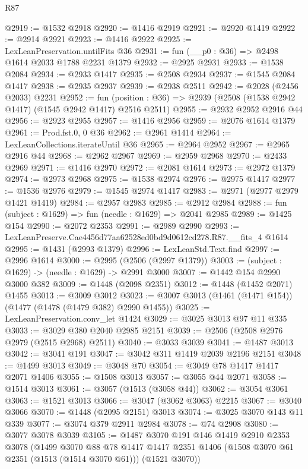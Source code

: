\begin{lexlean}{R87}
\begin{coremodule}
{{@2919 := @1532 @2918
@2920 := @1416 @2919
@2921 := @2920 @1419
@2922 := @2914 @2921
@2923 := @1416 @2922
@2925 := LexLeanPreservation.untilFits @36
@2931 := fun (__p0 : @36) => @2498 @1614 @2033 @1788 @2231 @1379
@2932 := @2925 @2931
@2933 := @1538 @2084
@2934 := @2933 @1417
@2935 := @2508 @2934
@2937 := @1545 @2084 @1417
@2938 := @2935 @2937
@2939 := @2938 @2511
@2942 := @2028 (@2456 @2033) @2231
@2952 := fun (position : @36) => @2939 (@2508 (@1538 @2942 @1417) (@1545 @2942 @1417) @2516 @2511)
@2955 := @2932 @2952 @2916 @44
@2956 := @2923 @2955
@2957 := @1416 @2956
@2959 := @2076 @1614 @1379
@2961 := Prod.fst.{0, 0} @36
@2962 := @2961 @1414
@2964 := LexLeanCollections.iterateUntil @36
@2965 := @2964 @2952
@2967 := @2965 @2916 @44
@2968 := @2962 @2967
@2969 := @2959 @2968
@2970 := @2433 @2969
@2971 := @1416 @2970
@2972 := @2081 @1614
@2973 := @2972 @1379
@2974 := @2973 @2968
@2975 := @1538 @2974
@2976 := @2975 @1417
@2977 := @1536 @2976
@2979 := @1545 @2974 @1417
@2983 := @2971 (@2977 @2979 @1421 @1419)
@2984 := @2957 @2983
@2985 := @2912 @2984
@2988 := fun (subject : @1629) => fun (needle : @1629) => @2041 @2985
@2989 := @1425 @154
@2990 := @2072 @2353
@2991 := @2989 @2990
@2993 := LexLeanPreserve.Cae4456d77aa62528ed0bd9d0612cd278.R87.__fits_4 @1614
@2995 := @1431 (@2993 @1379)
@2996 := LexLeanStd.Text.find
@2997 := @2996 @1614
@3000 := @2995 (@2506 (@2997 @1379))
@3003 := (subject : @1629) -> (needle : @1629) -> @2991 @3000
@3007 := @1442 @154 @2990 @3000 @382
@3009 := @1448 (@2098 @2351)
@3012 := @1448 (@1452 @2071) @1455
@3013 := @3009 @3012
@3023 := @3007 @3013 (@1461 (@1471 @154)) (@1477 (@1478 (@1479 @382) @2990 @1455))
@3025 := LexLeanPreservation.conv_let @1424
@3029 := @3025 @3013 @97 @11 @335
@3033 := @3029 @380 @2040 @2985 @2151
@3039 := @2506 (@2508 @2976 @2979 (@2515 @2968) @2511)
@3040 := @3033 @3039
@3041 := @1487 @3013
@3042 := @3041 @191
@3047 := @3042 @311 @1419 @2039 @2196 @2151
@3048 := @1499 @3013
@3049 := @3048 @70
@3054 := @3049 @78 @1417 @1417 @2071 @1406
@3055 := @1508 @3013
@3057 := @3055 @44 @2071
@3058 := @1514 @3013
@3061 := @3057 (@1513 (@3058 @44))
@3062 := @3054 @3061
@3063 := @1521 @3013
@3066 := @3047 (@3062 @3063) @2215
@3067 := @3040 @3066
@3070 := @1448 (@2095 @2151) @3013
@3074 := @3025 @3070 @143 @11 @339
@3077 := @3074 @379 @2911 @2984
@3078 := @74 @2908
@3080 := @3077 @3078 @3039
@3105 := @1487
    @3070
    @191
    @146
    @1419
    @2910
    @2353
    @3078
    (@1499
      @3070
      @88
      @78
      @1417
      @1417
      @2351
      @1406
      (@1508 @3070 @61 @2351 (@1513 (@1514 @3070 @61)))
      (@1521 @3070))
}}
\end{coremodule}
\end{lexlean}

